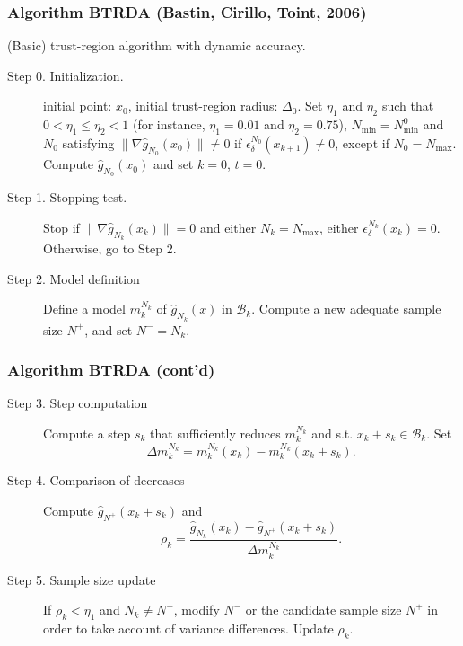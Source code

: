 \documentclass[aspectratio=169]{beamer}
\begin{document}
\begin{frame}
\frametitle{Algorithm BTRDA (Bastin, Cirillo, Toint, 2006)}

(Basic) trust-region algorithm with dynamic accuracy.

\mbox{}

\begin{description}
\item[Step 0. Initialization.]

initial point: $x_0$, initial trust-region radius: $\Delta_0$.
Set $\eta_1$ and $\eta_2$ such that $0 < \eta_1 \leq
\eta_2 < 1$ (for instance, $\eta_1 = 0.01$ and $\eta_2 = 0.75$),
$N_{\min} = N^0_{\min}$ and %
$N_0$ satisfying $\| \nabla \hat{g}_{N_0} (x_0) \| \ne 0$ if $\epsilon_{\delta}^{N_0}(x_{k+1}) \ne
0$, except if $N_0 = N_{\max}$.
Compute $\hat{g}_{N_0}(x_0)$ and set $k = 0$, $t = 0$.
\item[Step 1. Stopping test.]
Stop if $\| \nabla \hat{g}_{N_{k}}(x_{k})\| = 0$ and either
$N_k = N_{\max}$, either $\epsilon_{\delta}^{N_k}(x_k) = 0$.
Otherwise, go to Step 2.
\item[Step 2. Model definition]
Define a model $m_k^{N_k}$ of $\hat{g}_{N_k}(x)$ in $\mathcal{B}_k$.
Compute a new adequate sample size $N^{+}$, and set $N^- = N_k$.
\end{description}

\end{frame}

\begin{frame}
\frametitle{Algorithm BTRDA (cont'd)}

\begin{description}
\item[Step 3. Step computation]
Compute a step $s_k$ that sufficiently reduces $m_k^{N_k}$ and s.t. $x_k + s_k \in \mathcal{B}_k$.
Set
\[ \Delta m_k^{N_k} = m_k^{N_k}(x_k) - m_k^{N_k}(x_k+s_k). \]
\item[Step 4. Comparison of decreases]
Compute $\hat{g}_{N^+} (x_k + s_k)$ and %
\[
\rho_k = \frac{\hat{g}_{N_k}(x_k) - \hat{g}_{N^+}(x_k+s_k)}
{\Delta m_k^{N_k}}.
\]
\item[Step 5. Sample size update]
If $\rho_k < \eta_1$ and $N_k \ne N^+$, modify $N^-$ or the candidate sample size $N^+$ in order to take account of variance differences.
Update $\rho_k$.
\end{description}

\end{frame}
\end{document}
